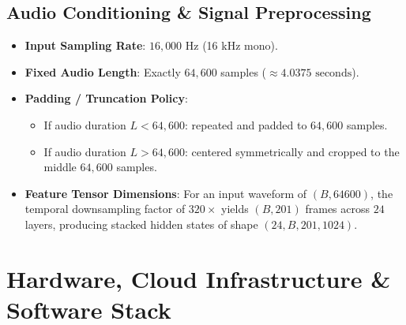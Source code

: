 \documentclass[11pt,a4paper]{article}
\begin{document}
\subsection{Audio Conditioning \& Signal Preprocessing}
\begin{itemize}
    \item \textbf{Input Sampling Rate}: $16,000\text{ Hz}$ (16 kHz mono).
    \item \textbf{Fixed Audio Length}: Exactly $64,600$ samples ($\approx 4.0375\text{ seconds}$).
    \item \textbf{Padding / Truncation Policy}:
    \begin{itemize}
        \item If audio duration $L < 64,600$: repeated and padded to $64,600$ samples.
        \item If audio duration $L > 64,600$: centered symmetrically and cropped to the middle $64,600$ samples.
    \end{itemize}
    \item \textbf{Feature Tensor Dimensions}: For an input waveform of $(B, 64600)$, the temporal downsampling factor of $320\times$ yields $(B, 201)$ frames across $24$ layers, producing stacked hidden states of shape $(24, B, 201, 1024)$.
\end{itemize}

\section{Hardware, Cloud Infrastructure \& Software Stack}
\end{document}
